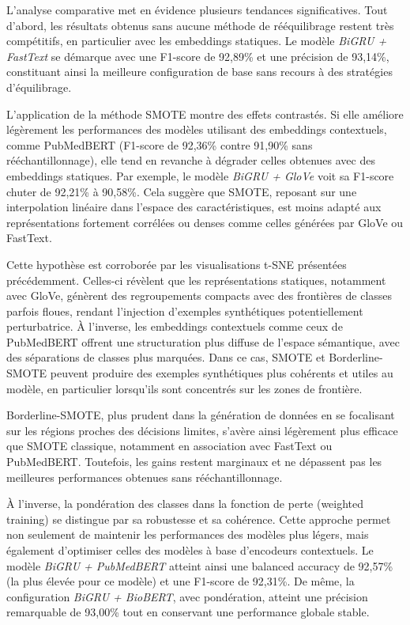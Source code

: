 \documentclass[12pt]{report}
\begin{document}
L’analyse comparative met en évidence plusieurs tendances significatives. Tout d’abord, les résultats obtenus sans aucune méthode de rééquilibrage restent très compétitifs, en particulier avec les embeddings statiques. Le modèle \textit{BiGRU + FastText} se démarque avec une F1-score de 92,89\% et une précision de 93,14\%, constituant ainsi la meilleure configuration de base sans recours à des stratégies d’équilibrage.

L'application de la méthode SMOTE montre des effets contrastés. Si elle améliore légèrement les performances des modèles utilisant des embeddings contextuels, comme PubMedBERT (F1-score de 92,36\% contre 91,90\% sans rééchantillonnage), elle tend en revanche à dégrader celles obtenues avec des embeddings statiques. Par exemple, le modèle \textit{BiGRU + GloVe} voit sa F1-score chuter de 92,21\% à 90,58\%. Cela suggère que SMOTE, reposant sur une interpolation linéaire dans l’espace des caractéristiques, est moins adapté aux représentations fortement corrélées ou denses comme celles générées par GloVe ou FastText.

Cette hypothèse est corroborée par les visualisations t-SNE présentées précédemment. Celles-ci révèlent que les représentations statiques, notamment avec GloVe, génèrent des regroupements compacts avec des frontières de classes parfois floues, rendant l’injection d’exemples synthétiques potentiellement perturbatrice. À l’inverse, les embeddings contextuels comme ceux de PubMedBERT offrent une structuration plus diffuse de l’espace sémantique, avec des séparations de classes plus marquées. Dans ce cas, SMOTE et Borderline-SMOTE peuvent produire des exemples synthétiques plus cohérents et utiles au modèle, en particulier lorsqu’ils sont concentrés sur les zones de frontière.

Borderline-SMOTE, plus prudent dans la génération de données en se focalisant sur les régions proches des décisions limites, s'avère ainsi légèrement plus efficace que SMOTE classique, notamment en association avec FastText ou PubMedBERT. Toutefois, les gains restent marginaux et ne dépassent pas les meilleures performances obtenues sans rééchantillonnage.

À l’inverse, la pondération des classes dans la fonction de perte (weighted training) se distingue par sa robustesse et sa cohérence. Cette approche permet non seulement de maintenir les performances des modèles plus légers, mais également d’optimiser celles des modèles à base d’encodeurs contextuels. Le modèle \textit{BiGRU + PubMedBERT} atteint ainsi une balanced accuracy de 92,57\% (la plus élevée pour ce modèle) et une F1-score de 92,31\%. De même, la configuration \textit{BiGRU + BioBERT}, avec pondération, atteint une précision remarquable de 93,00\% tout en conservant une performance globale stable.
\end{document}
